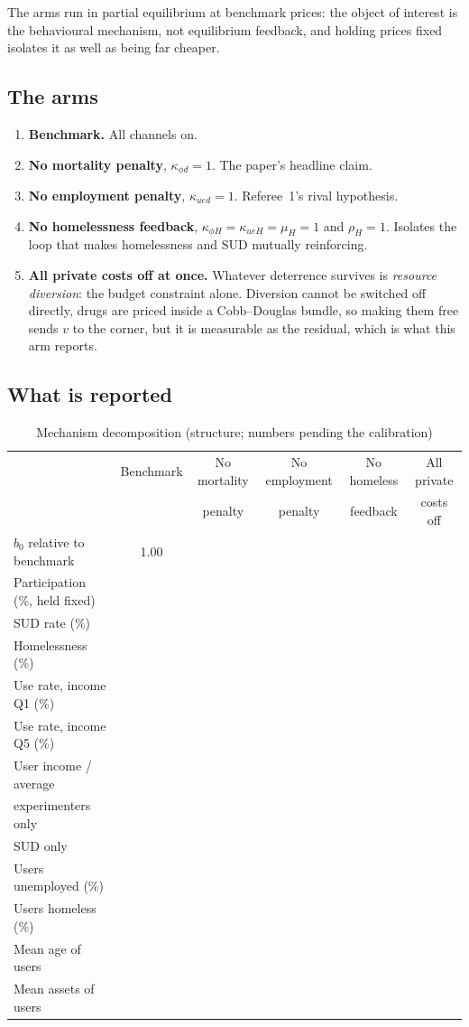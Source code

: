 \documentclass[11pt]{article}
\begin{document}
The arms run in partial equilibrium at benchmark prices: the object of interest
is the behavioural mechanism, not equilibrium feedback, and holding prices fixed
isolates it as well as being far cheaper.

\subsection{The arms}

\begin{enumerate}
\item \textbf{Benchmark.} All channels on.
\item \textbf{No mortality penalty}, $\kappa_{\phi d}=1$. The paper's headline
claim.
\item \textbf{No employment penalty}, $\kappa_{ued}=1$. Referee~1's rival
hypothesis.
\item \textbf{No homelessness feedback}, $\kappa_{\phi H}=\kappa_{ueH}=\mu_H=1$
and $\rho_H=1$. Isolates the loop that makes homelessness and SUD mutually
reinforcing.
\item \textbf{All private costs off at once.} Whatever deterrence survives is
\emph{resource diversion}: the budget constraint alone. Diversion cannot be
switched off directly, drugs are priced inside a Cobb--Douglas bundle, so
making them free sends $v$ to the corner, but it is measurable as the
residual, which is what this arm reports.
\end{enumerate}

\subsection{What is reported}

\begin{table}[h]
\centering
\caption{Mechanism decomposition (structure; numbers pending the calibration)}
\label{tab:mech}
\begin{tabular}{lccccc}
\toprule
& Benchmark & No mortality & No employment & No homeless & All private\\
& & penalty & penalty & feedback & costs off\\
\midrule
$b_0$ relative to benchmark & 1.00 & & & &\\
Participation (\%, held fixed) & & & & &\\
SUD rate (\%) & & & & &\\
Homelessness (\%) & & & & &\\
\addlinespace
Use rate, income Q1 (\%) & & & & &\\
Use rate, income Q5 (\%) & & & & &\\
\addlinespace
User income / average & & & & &\\
\quad experimenters only & & & & &\\
\quad SUD only & & & & &\\
Users unemployed (\%) & & & & &\\
Users homeless (\%) & & & & &\\
Mean age of users & & & & &\\
Mean assets of users & & & & &\\
\bottomrule
\end{tabular}
\end{table}
\end{document}
